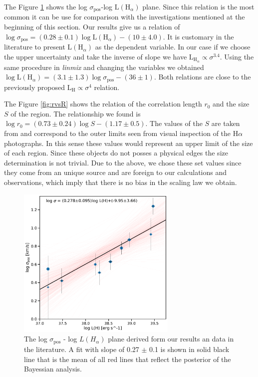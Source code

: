 \documentclass[fleqn,usenatbib, useAMS, a4paper]{mnras}
\newcommand\pos{\ensuremath{_{\mathrm{pos}}}}
\newcommand\ha{\ensuremath{\text{H}\alpha}}
\begin{document}
The Figure \ref{fig:sigvsl} shows the log \(\sigma\pos\)-log \(\text{L}(\text{H}_{\alpha})\) plane.
Since this relation is the most common it can be use for comparison with the investigations mentioned at the beginning of this section.
Our results give us a relation of \(\log \sigma\pos = (0.28 \pm 0.1) \log \text{L}(\text{H}_{\alpha})-(10 \pm 4.0)\).
It is customary in the literature to present \(\text{L} (\text{H}_{\alpha})\) as the dependent variable.
In our case if we choose the upper uncertainty and take the inverse of slope we have \(\text{L}_{\text{H}_{\alpha}} \propto \sigma^{3.4}\). 
Using the same procedure in \textit{linmix} and changing the variables we obtained \(\log \text{L}(\text{H}_{\alpha}) = (3.1\pm 1.3) \log \sigma\pos -(36 \pm 1)\).
Both relations are close to the previously proposed \(\text{L}_{\text{H}} \propto \sigma^{4}\) relation.

The Figure \ref{fig:rvsR} shows the relation of the correlation length \(r_0\) and the size \(S\) of the region. 
The relationship we found is \(\log r_0 = (0.73 \pm 0.24) \log S - (1.17 \pm 0.5)\).
The values of the \(S\) are taken from \citet{1984ApJ...287..116K} and correspond to the outer
limits seen from visual inspection of the \ha{} photographs.
In this sense these values would represent an upper limit of the size of each region.
Since these objects do not posses a physical edges the size determination is not trivial.
Due to the above, we chose these set values since they come from an unique source and are foreign to our calculations and observations, which imply that there is no bias in the scaling law we obtain.  




\begin{figure}
\centering 
\includegraphics[width=3in]{Figures/corr-svsL}
\caption{The log \(\sigma\pos\) - log $L(H_{\alpha})$ plane derived form our results an data in the literature. A fit with slope of 0.27 $\pm$ 0.1 is shown in solid black line that is the mean of all red lines that reflect the posterior of the Bayessian analysis. }
\label{fig:sigvsl}
\end{figure}
\end{document}
